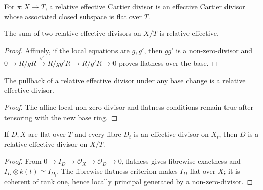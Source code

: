 \begin{definition}\label{def:milne-relative-effective-divisor}
For $\pi:X\to T$, a relative effective Cartier divisor is an effective Cartier divisor whose associated closed subspace is flat over $T$.
\end{definition}
\begin{lemma}\label{lem:milne-relative-divisor-sum}
The sum of two relative effective divisors on $X/T$ is relative effective.
\end{lemma}

\begin{proof}

Affinely, if the local equations are $g,g'$, then $gg'$ is a non-zero-divisor and $0\to R/gR\xrightarrow{g'}R/gg'R\to R/g'R\to0$ proves flatness over the base.

\end{proof}

\begin{proposition}\label{prop:milne-relative-divisor-base-change}
The pullback of a relative effective divisor under any base change is a relative effective divisor.
\end{proposition}

\begin{proof}
The affine local non-zero-divisor and flatness conditions remain true after tensoring with the new base ring.
\end{proof}

\begin{proposition}\label{prop:milne-relative-divisor-fibrewise}
If $D,X$ are flat over $T$ and every fibre $D_t$ is an effective divisor on $X_t$, then $D$ is a relative effective divisor on $X/T$.
\end{proposition}

\begin{proof}

From $0\to I_D\to\mathcal O_X\to\mathcal O_D\to0$, flatness gives fibrewise exactness and $I_D\otimes k(t)\simeq I_{D_t}$. The fibrewise flatness criterion makes $I_D$ flat over $X$; it is coherent of rank one, hence locally principal generated by a non-zero-divisor.

\end{proof}

